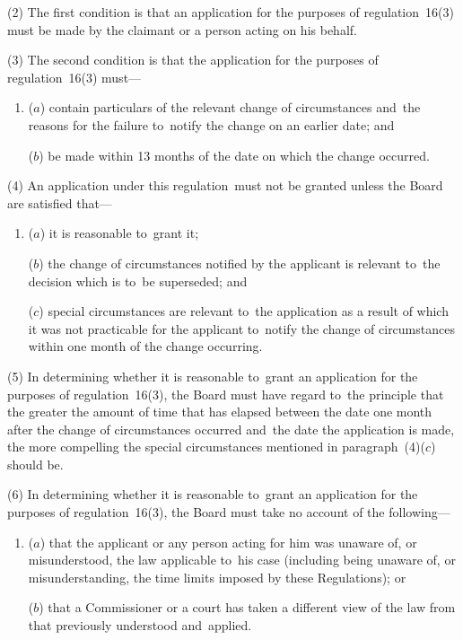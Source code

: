 \documentclass[12pt,a4paper]{article}
\begin{document}
(2) The first condition is that an application for the purposes of regulation~16(3) must be made by the claimant or a person acting on his behalf.

(3) The second condition is that the application for the purposes of regulation~16(3) must—
\begin{enumerate}\item[]
($a$) contain particulars of the relevant change of circumstances and~the reasons for the failure to~notify the change on an earlier date; and

($b$) be made within 13 months of the date on which the change occurred.
\end{enumerate}

(4) An application under this regulation~must not be granted unless the Board are satisfied that—
\begin{enumerate}\item[]
($a$) it is reasonable to~grant it;

($b$) the change of circumstances notified by the applicant is relevant to~the decision which is to~be superseded; and

($c$) special circumstances are relevant to~the application as a result of which it was not practicable for the applicant to~notify the change of circumstances within one month of the change occurring.
\end{enumerate}

(5) In determining whether it is reasonable to~grant an application for the purposes of regulation~16(3), the Board must have regard to~the principle that the greater the amount of time that has elapsed between the date one month after the change of circumstances occurred and~the date the application is made, the more compelling the special circumstances mentioned in paragraph~(4)($c$)  should be.

(6) In determining whether it is reasonable to~grant an application for the purposes of regulation~16(3), the Board must take no account of the following—
\begin{enumerate}\item[]
($a$) that the applicant or any person acting for him was unaware of, or misunderstood, the law applicable to~his case (including being unaware of, or misunderstanding, the time limits imposed by these Regulations); or

($b$) that a Commissioner or a court has taken a different view of the law from that previously understood and~applied.
\end{enumerate}
\end{document}
